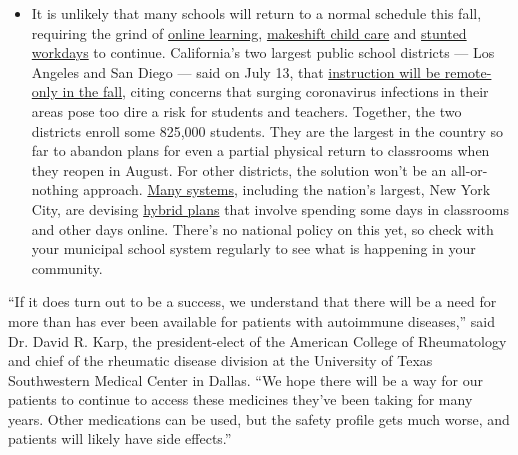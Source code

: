 \begin{itemize}
  \begin{itemize}
  \tightlist
  \item
    It is unlikely that many schools will return to a normal schedule
    this fall, requiring the grind of
    \href{https://www.nytimes.com/2020/06/05/us/coronavirus-education-lost-learning.html?action=click\&pgtype=Article\&state=default\&region=MAIN_CONTENT_3\&context=storylines_faq}{online
    learning},
    \href{https://www.nytimes.com/2020/05/29/us/coronavirus-child-care-centers.html?action=click\&pgtype=Article\&state=default\&region=MAIN_CONTENT_3\&context=storylines_faq}{makeshift
    child care} and
    \href{https://www.nytimes.com/2020/06/03/business/economy/coronavirus-working-women.html?action=click\&pgtype=Article\&state=default\&region=MAIN_CONTENT_3\&context=storylines_faq}{stunted
    workdays} to continue. California's two largest public school
    districts --- Los Angeles and San Diego --- said on July 13, that
    \href{https://www.nytimes.com/2020/07/13/us/lausd-san-diego-school-reopening.html?action=click\&pgtype=Article\&state=default\&region=MAIN_CONTENT_3\&context=storylines_faq}{instruction
    will be remote-only in the fall}, citing concerns that surging
    coronavirus infections in their areas pose too dire a risk for
    students and teachers. Together, the two districts enroll some
    825,000 students. They are the largest in the country so far to
    abandon plans for even a partial physical return to classrooms when
    they reopen in August. For other districts, the solution won't be an
    all-or-nothing approach.
    \href{https://bioethics.jhu.edu/research-and-outreach/projects/eschool-initiative/school-policy-tracker/}{Many
    systems}, including the nation's largest, New York City, are
    devising
    \href{https://www.nytimes.com/2020/06/26/us/coronavirus-schools-reopen-fall.html?action=click\&pgtype=Article\&state=default\&region=MAIN_CONTENT_3\&context=storylines_faq}{hybrid
    plans} that involve spending some days in classrooms and other days
    online. There's no national policy on this yet, so check with your
    municipal school system regularly to see what is happening in your
    community.
  \end{itemize}
\end{itemize}

``If it does turn out to be a success, we understand that there will be
a need for more than has ever been available for patients with
autoimmune diseases,'' said Dr. David R. Karp, the president-elect of
the American College of Rheumatology and chief of the rheumatic disease
division at the University of Texas Southwestern Medical Center in
Dallas. ``We hope there will be a way for our patients to continue to
access these medicines they've been taking for many years. Other
medications can be used, but the safety profile gets much worse, and
patients will likely have side effects.''

